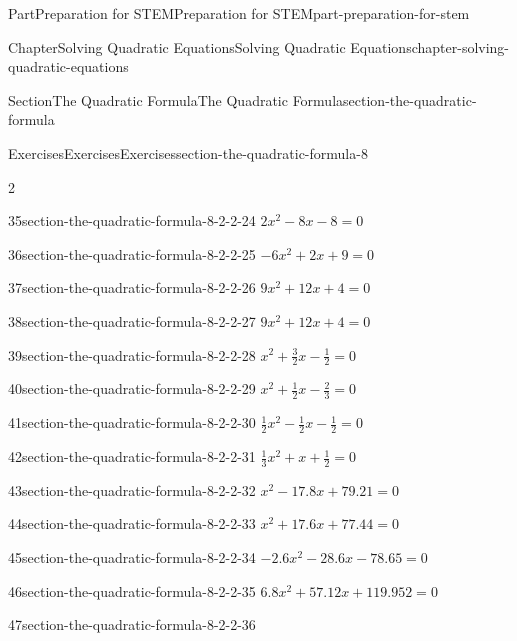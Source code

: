 \documentclass[twoside,10pt,]{book}
\numberwithin{equation}{section}
\begin{document}
\begin{partptx}{Part}{Preparation for STEM}{}{Preparation for STEM}{}{}{part-preparation-for-stem}
\begin{chapterptx}{Chapter}{Solving Quadratic Equations}{}{Solving Quadratic Equations}{}{}{chapter-solving-quadratic-equations}
\begin{sectionptx}{Section}{The Quadratic Formula}{}{The Quadratic Formula}{}{}{section-the-quadratic-formula}
\begin{exercises-subsection}{Exercises}{Exercises}{}{Exercises}{}{}{section-the-quadratic-formula-8}
\begin{exercisegroupcol}{2}
\begin{divisionexerciseegcol}{35}{}{}{section-the-quadratic-formula-8-2-2-24}
\({2x^{2}-8x-8}=0\)%
\end{divisionexerciseegcol}%
\begin{divisionexerciseegcol}{36}{}{}{section-the-quadratic-formula-8-2-2-25}%
\({-6x^{2}+2x+9}=0\)%
\end{divisionexerciseegcol}%
\begin{divisionexerciseegcol}{37}{}{}{section-the-quadratic-formula-8-2-2-26}%
\({9x^{2}+12x+4}=0\)%
\end{divisionexerciseegcol}%
\begin{divisionexerciseegcol}{38}{}{}{section-the-quadratic-formula-8-2-2-27}%
\({9x^{2}+12x+4}=0\)%
\end{divisionexerciseegcol}%
\begin{divisionexerciseegcol}{39}{}{}{section-the-quadratic-formula-8-2-2-28}%
\({x^{2}+{\frac{3}{2}}x - {\frac{1}{2}}}=0\)%
\end{divisionexerciseegcol}%
\begin{divisionexerciseegcol}{40}{}{}{section-the-quadratic-formula-8-2-2-29}%
\({x^{2}+{\frac{1}{2}}x - {\frac{2}{3}}}=0\)%
\end{divisionexerciseegcol}%
\begin{divisionexerciseegcol}{41}{}{}{section-the-quadratic-formula-8-2-2-30}%
\({{\frac{1}{2}}x^{2} - {\frac{1}{2}}x - {\frac{1}{2}}}=0\)%
\end{divisionexerciseegcol}%
\begin{divisionexerciseegcol}{42}{}{}{section-the-quadratic-formula-8-2-2-31}%
\({{\frac{1}{3}}x^{2}+x+{\frac{1}{2}}}=0\)%
\end{divisionexerciseegcol}%
\begin{divisionexerciseegcol}{43}{}{}{section-the-quadratic-formula-8-2-2-32}%
\({x^{2}-17.8x+79.21}=0\)%
\end{divisionexerciseegcol}%
\begin{divisionexerciseegcol}{44}{}{}{section-the-quadratic-formula-8-2-2-33}%
\({x^{2}+17.6x+77.44}=0\)%
\end{divisionexerciseegcol}%
\begin{divisionexerciseegcol}{45}{}{}{section-the-quadratic-formula-8-2-2-34}%
\({-2.6x^{2}-28.6x-78.65}=0\)%
\end{divisionexerciseegcol}%
\begin{divisionexerciseegcol}{46}{}{}{section-the-quadratic-formula-8-2-2-35}%
\({6.8x^{2}+57.12x+119.952}=0\)%
\end{divisionexerciseegcol}%
\begin{divisionexerciseegcol}{47}{}{}{section-the-quadratic-formula-8-2-2-36}%

\end{divisionexerciseegcol}
\end{exercisegroupcol}
\end{exercises-subsection}
\end{sectionptx}
\end{chapterptx}
\end{partptx}
\end{document}
